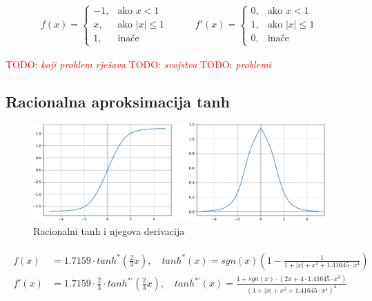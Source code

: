 \documentclass[times, utf8, numeric, diplomski]{fer}
\def\TODO#1{\noindent\textcolor{red}{TODO: \textit{#1}}\newline}
\def\todo#1{\TODO{#1}}
\begin{document}
\begin{equation}
\label{eq:htanh}
\begin{split}
f(x) =
\begin{cases}
-1,	 		& \text{ako } x < 1 \\
x,	 		& \text{ako } |x| \leq 1 \\
1,	& \text{inače}
\end{cases}
\end{split}
\qquad
\begin{split}
f'(x) =
\begin{cases}
0,	 		& \text{ako } x < 1 \\
1,	 		& \text{ako } |x| \leq 1 \\
0,	& \text{inače}
\end{cases}
\end{split}
\end{equation}

\todo{koji problem rješava}
\todo{svojstva}
\todo{problemi}

\subsection{Racionalna aproksimacija tanh}

\begin{figure}[H]
\includegraphics[width=\textwidth]{Rational_tanh.pdf}
\centering
\caption{Racionalni tanh i njegova derivacija}
\label{fig:rational_tanh}
\end{figure}

\begin{align}
\label{eq:rattanh}
\begin{split}
f(x) &= 1.7159 \cdot tanh^*(\frac{2}{3}x), \quad
tanh^*(x) = sgn(x)(1 - \frac{1}{1 + |x| + x^2 + 1.41645 \cdot x^4}) \\
f'(x) &= 1.7159 \cdot \frac{2}{3} \cdot tanh^{*'}(\frac{2}{3}x), \quad
tanh^{*'}(x) = \frac{1+sgn(x) \cdot (2x + 4 \cdot 1.41645 \cdot x^3)}{(1 + |x| + x^2 + 1.41645 \cdot x^4)^2}
\end{split}
\end{align}
\end{document}
